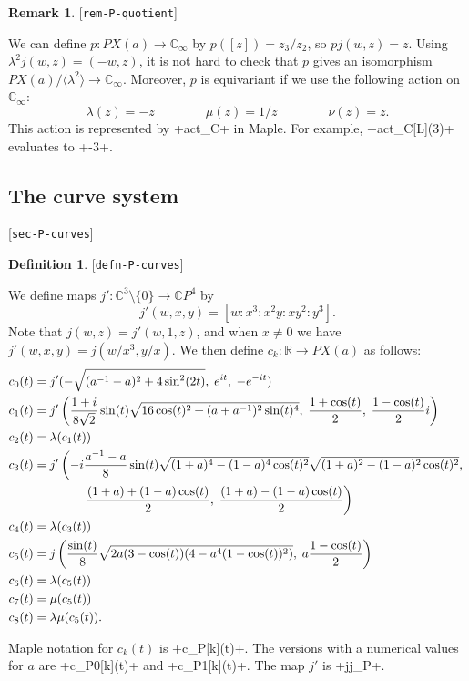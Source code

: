 \documentclass[reqno]{amsart}
\newcommand{\lbl}[1]{\label{#1}\textup{[\texttt{#1}]}\par}
\newcommand{\lbl}{\label}
\newcommand{\lm}        {\lambda}
\newcommand{\R}         {{\mathbb{R}}}
\newcommand{\C}         {{\mathbb{C}}}
\newcommand{\ov}[1]     {\overline{#1}}
\newcommand{\ip}[1]     {\langle #1\rangle}
\newcommand{\sm}        {\setminus}
\newcommand{\rt}        {\sqrt{2}}
\renewcommand{\:}{\colon}
\theoremstyle{definition}
\newtheorem{remark}[theorem]{Remark}
\newtheorem{definition}[theorem]{Definition}
\begin{document}
\begin{remark}\lbl{rem-P-quotient}
 We can define $p\:PX(a)\to\C_\infty$ by $p([z])=z_3/z_2$, so
 $pj(w,z)=z$.  Using $\lm^2j(w,z)=(-w,z)$, it is not hard to check
 that $p$ gives an isomorphism $PX(a)/\ip{\lm^2}\to\C_\infty$.
 Moreover, $p$ is equivariant if we use the following action on
 $\C_\infty$:
 \[ \lm(z) = -z \hspace{4em}
    \mu(z) = 1/z \hspace{4em}
    \nu(z) = \ov{z}.
 \]
 This action is represented by \mcode+act_C+ in Maple.  For example,
 \mcode+act_C[L](3)+ evaluates to \mcode+-3+.
\end{remark}

\subsection{The curve system}
\lbl{sec-P-curves}

\begin{definition}\lbl{defn-P-curves}
 We define maps $j'\:\C^3\sm\{0\}\to\C P^4$ by
 \[ j'(w,x,y) = [w:x^3:x^2y:xy^2:y^3]. \]
 Note that $j(w,z)=j'(w,1,z)$, and when $x\neq 0$ we have
 $j'(w,x,y)=j(w/x^3,y/x)$.  We then define $c_k\:\R\to PX(a)$ as follows:
 \begin{align*}
  c_0(t) &=
   j'(-\sqrt{(a^{-1}-a)^2+4\sin^2(2t)},\;e^{it},\;-e^{-it}) \\
  c_1(t) &=
   j'\left(\frac{1+i}{8\rt}\sin(t)
           \sqrt{16\cos(t)^2+(a+a^{-1})^2\sin(t)^4},\;
           \frac{1+\cos(t)}{2},\;\frac{1-\cos(t)}{2}i\right) \\
  c_2(t) &= \lm(c_1(t)) \\
  c_3(t) &=
   j'\left(-i\frac{a^{-1}-a}{8}
               \sin(t)\sqrt{(1+a)^4-(1-a)^4\cos(t)^2}
                      \sqrt{(1+a)^2-(1-a)^2\cos(t)^2},\right. \\
         & \left.\qquad\qquad\vphantom{\frac{a^{-1}-a}{8}}
           \frac{(1+a)+(1-a)\cos(t)}{2},\;
           \frac{(1+a)-(1-a)\cos(t)}{2}\right)  \\
  c_4(t) &= \lm(c_3(t)) \\
  c_5(t) &= j\left(\frac{\sin(t)}{8}\sqrt{2a(3-\cos(t))(4-a^4(1-\cos(t))^2)},\;
                    a \frac{1 - \cos(t)}{2}\right) \\
  c_6(t) &= \lm(c_5(t)) \\
  c_7(t) &= \mu(c_5(t)) \\
  c_8(t) &= \lm\mu(c_5(t)).
 \end{align*}
\end{definition}
Maple notation for $c_k(t)$ is \mcode+c_P[k](t)+.  The versions with a
numerical values for $a$ are \mcode+c_P0[k](t)+ and
\mcode+c_P1[k](t)+.  The map $j'$ is \mcode+jj_P+.
\end{document}
